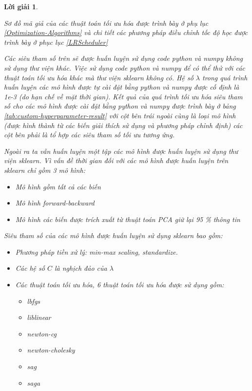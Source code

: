 \documentclass[14pt, a4paper]{article}
\theoremstyle{sltheorem}
\theoremstyle{soltheorem}
\newtheorem*{loigiai}{Lời giải}
\begin{document}
\begin{loigiai}
\begin{itemize}
        Sơ đồ mã giả của các thuật toán tối ưu hóa được trình bày ở phụ lục \ref{Optimization-Algorithms} và chi tiết các phương pháp điều chỉnh tốc độ học được trình bày ở phục lục \ref{LRScheduler}
    \end{itemize}

    Các siêu tham số trên sẽ được huấn luyện sử dụng code python và numpy không sử dụng thư viện khác.
    Việc sử dụng code python và numpy để có thể thử với các thuật toán tối ưu hóa khác mà thư viện sklearn không có.
    Hệ số $\lambda$ trong quá trình huấn luyện các mô hình được tự cài đặt bằng python và numpy được cố định là 1e-3 (do hạn chế về mặt thời gian).
    Kết quả của quá trình tối ưu hóa siêu tham số cho các mô hình được cài đặt bằng python và numpy được trình bày ở bảng \ref{tab:custom-hyperparameter-result} với cột bên trái ngoài cùng là loại mô hình (được hình thành từ các biến giải thích sử dụng và phương pháp chỉnh định) các cột bên phải là tổ hợp các siêu tham số tối ưu tương ứng.

    Ngoài ra ta vẫn huấn luyện một tập các mô hình được huấn luyện sử dụng thư viện sklearn.
    Vì vấn đề thời gian đối với các mô hình được huấn luyện trên sklearn chỉ gồm 3 mô hình:
    \begin{itemize}
        \item Mô hình gồm tất cả các biến
        \item Mô hình forward-backward
        \item Mô hình các biến được trích xuất từ thuật toán PCA giữ lại 95 \% thông tin
    \end{itemize}
    Siêu tham số của các mô hình được huấn luyện sử dụng sklearn bao gồm:

    \begin{itemize}
        \item Phương pháp tiền xử lý: min-max scaling, standardize.
        \item Các hệ số $C$ là nghịch đảo của $\lambda$
        \item Các thuật toán tối ưu hóa, 6 thuật toán tối ưu hóa được sử dụng gồm:
        \begin{itemize}
            \item lbfgs
            \item liblinear
            \item newton-cg 
            \item newton-cholesky
            \item sag 
            \item saga
        \end{itemize}
    \end{itemize}


\end{loigiai}
\end{document}
